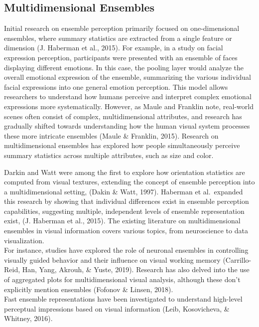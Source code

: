\documentclass[print]{nuthesis}
\begin{document}
\hypertarget{multidimensional-ensembles}{%
\subsection{Multidimensional Ensembles}\label{multidimensional-ensembles}}

Initial research on ensemble perception primarily focused on one-dimensional ensembles, where summary statistics are extracted from a single feature or dimension (J. Haberman et al., 2015).
For example, in a study on facial expression perception, participants were presented with an ensemble of faces displaying different emotions.
In this case, the pooling layer would analyze the overall emotional expression of the ensemble, summarizing the various individual facial expressions into one general emotion perception.
This model allows researchers to understand how humans perceive and interpret complex emotional expressions more systematically.
However, as Maule and Franklin note, real-world scenes often consist of complex, multidimensional attributes, and research has gradually shifted towards understanding how the human visual system processes these more intricate ensembles (Maule \& Franklin, 2015).
Research on multidimensional ensembles has explored how people simultaneously perceive summary statistics across multiple attributes, such as size and color.

Darkin and Watt were among the first to explore how orientation statistics are computed from visual textures, extending the concept of ensemble perception into a multidimensional setting, (Dakin \& Watt, 1997).
Haberman et al.~expanded this research by showing that individual differences exist in ensemble perception capabilities, suggesting multiple, independent levels of ensemble representation exist, (J. Haberman et al., 2015).
The existing literature on multidimensional ensembles in visual information covers various topics, from neuroscience to data visualization.\\
For instance, studies have explored the role of neuronal ensembles in controlling visually guided behavior and their influence on visual working memory (Carrillo-Reid, Han, Yang, Akrouh, \& Yuste, 2019).
Research has also delved into the use of aggregated plots for multidimensional visual analysis, although these don't explicitly mention ensembles (Fofonov \& Linsen, 2018).\\
Fast ensemble representations have been investigated to understand high-level perceptual impressions based on visual information (Leib, Kosovicheva, \& Whitney, 2016).
\end{document}
